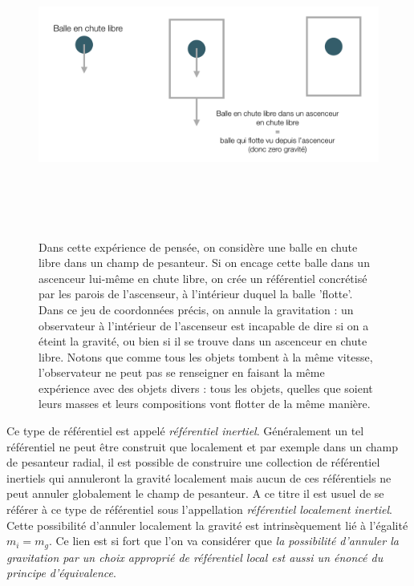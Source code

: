\begin{figure}[htbp]
	\centering
		\includegraphics[height=10cm]{figs/ascenceur.png}
	\caption[Annulation du champ de pesanteur]{Dans cette expérience de pensée, on considère une balle en chute libre dans un champ de pesanteur. Si on encage cette balle dans un ascenceur lui-même en chute libre, on crée un référentiel concrétisé par les parois de l'ascenseur, à l'intérieur duquel la balle 'flotte'. Dans ce jeu de coordonnées précis, on annule la gravitation : un observateur à l'intérieur de l'ascenseur est incapable de dire si on a éteint la gravité, ou bien si il se trouve dans un ascenceur en chute libre. Notons que comme tous les objets tombent à la même vitesse, l'observateur ne peut pas se renseigner en faisant la même expérience avec des objets divers : tous les objets, quelles que soient leurs masses et leurs compositions vont flotter de la même manière. }
	\label{f:ascenceur}
\end{figure}


Ce type de référentiel est appelé \textit{référentiel inertiel}. Généralement un tel référentiel ne peut être construit que localement et par exemple dans un champ de pesanteur radial, il est possible de construire une collection de référentiel inertiels qui annuleront la gravité localement mais aucun de ces référentiels ne peut annuler globalement le champ de pesanteur. A ce titre il est usuel de se référer à ce type de référentiel sous l'appellation \textit{référentiel localement inertiel}. Cette possibilité d'annuler localement la gravité est intrinsèquement lié à l'égalité $m_i=m_g$. Ce lien est si fort que l'on va considérer que \textit{la possibilité d'annuler la gravitation par un choix approprié de référentiel local est aussi un énoncé du principe d'équivalence}. 


